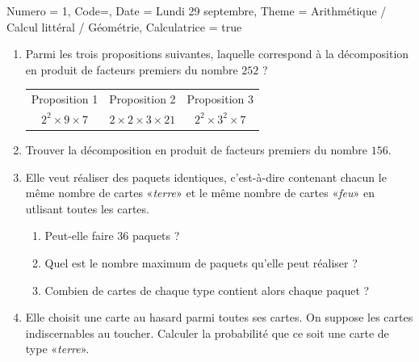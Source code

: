 \documentclass[11pt]{article}
\begin{document}
\begin{Maquette}[IE]{
        Numero = 1, Code={}, Date = Lundi 29 septembre, Theme = Arithmétique / Calcul littéral / Géométrie, Calculatrice = true
    }
\begin{exercice}
        \begin{enumerate}[itemsep=1em]
            \item Parmi les trois propositions suivantes, laquelle correspond à la décomposition en produit de facteurs premiers du nombre $252$ ?
                  \begin{center}
                      \renewcommand{\arraystretch}{1.2}
                      \begin{tabular}{|*{3}{c|}}
                          \hline
                          Proposition 1       & Proposition 2             & Proposition 3         \\
                          $2^2\times9\times7$ & $2\times2\times3\times21$ & $2^2\times3^2\times7$ \\
                          \hline
                      \end{tabular}
                  \end{center}
            \item Trouver la décomposition en produit de facteurs premiers du nombre $156$.
            \item Elle veut réaliser des paquets identiques, c'est-à-dire contenant chacun le même nombre de cartes «\emph{terre}»  et le même nombre de cartes «\emph{feu}»  en utlisant toutes les cartes.
                  \begin{enumerate}[label=\textbf{\alph*.}]
                      \item Peut-elle faire $36$ paquets ?
                      \item Quel est le nombre maximum de paquets qu'elle peut réaliser ?
                      \item Combien de cartes de chaque type contient alors chaque paquet ?
                  \end{enumerate}
            \item Elle choisit une carte au hasard parmi toutes ses cartes. On suppose les cartes indiscernables au toucher. Calculer la probabilité que ce soit une carte de type «\emph{terre}».
        \end{enumerate}
    \end{exercice}


\end{Maquette}
\end{document}
